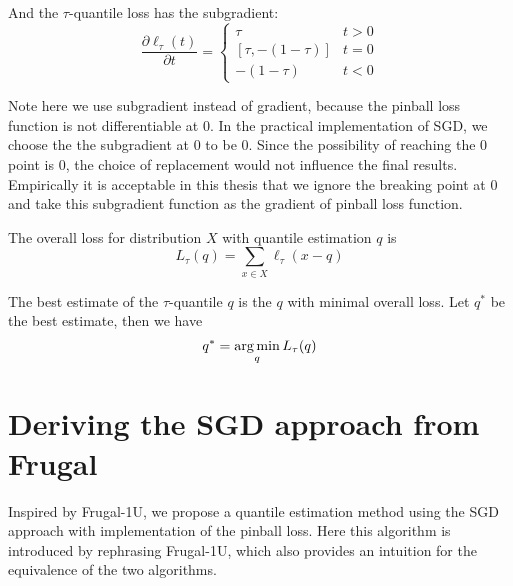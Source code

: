And the $\tau$-quantile loss has the {\color{black} subgradient}:
%
\begin{equation}
    \frac {\partial \ell_\tau(t)}{\partial t}= 
        \begin{cases}
            \tau                & t > 0\\
            [\tau, -(1-\tau)]                   & t = 0\\
            -(1-\tau)           & t < 0
        \end{cases}
\end{equation}

Note here we use subgradient instead of gradient, because the pinball loss function is not differentiable at $0$. In the practical implementation of SGD, we choose the the subgradient at $0$ to be $0$. Since the possibility of reaching the $0$ point is $0$, the choice of replacement would not influence the final results. Empirically it is acceptable in this thesis that we ignore the breaking point at $0$ and take this subgradient function as the gradient of pinball loss function.

The overall loss for distribution $X$ with quantile estimation $q$ is%
%
\begin{equation}
    L_{\tau}(q) = \sum_{x \in X} \ell_{\tau}(x - q)
\end{equation}


The best estimate of the $\tau$-quantile $q$ is the $q$ with minimal overall loss. 
Let $q^\ast$ be the best estimate, then we have
\begin{equation}
    q^\ast = \operatorname*{arg\,min}_{q} L_{\tau}(q)
\end{equation}



\section{Deriving the SGD approach from Frugal}
\label{sec: derive_sgd}
Inspired by Frugal-1U\cite{maFrugalStreamingEstimating2014}, we propose a quantile estimation method using the SGD approach with implementation of the pinball loss. Here this algorithm is introduced by rephrasing Frugal-1U, which also provides an intuition for the equivalence of the two algorithms.

